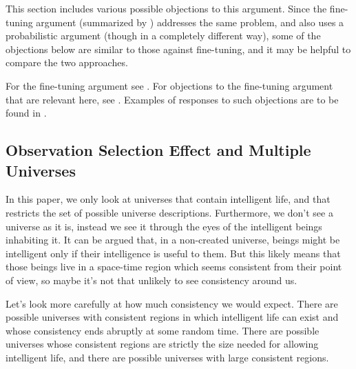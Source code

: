 \documentclass[a4paper
,draft
]{article}
\newcommand{\paper}[1]{paper}
\newcommand{\ghilimele}[1]{``#1"}
\begin{document}
This section includes various possible objections to this argument. Since the
fine-tuning argument (summarized by \parencite{sep-fine-tuning}) addresses the same problem, and also uses a
probabilistic argument (though in a completely different way), some of the
objections below are similar to those against fine-tuning, and it may be helpful
to compare the two approaches.

For the fine-tuning argument see \parencite{sep-fine-tuning}.
For objections to the fine-tuning argument that are relevant here, see
\parencites{Manson2003}{Manson2009}{McGrew2001}{Narveson2003}{Sober2009}.
Examples of responses to such objections are to be found in
\textcites{Leslie2003}{Swinburne2003}{Monton2006}{Kotzen2012}.



\subsection{Observation Selection Effect and Multiple Universes}

In this \paper{}, we only look at universes that contain intelligent life,
and that restricts the set of possible universe descriptions.
Furthermore, we don't see a universe as it is, instead we see it
through the eyes of the intelligent beings inhabiting it.
It can be argued that, in a non-created universe, beings might be intelligent
only if their intelligence is useful to them.
But this likely means that those beings live in a space-time region which seems
consistent from their point of view, so maybe it's not that unlikely to see
consistency around us.

Let's look more carefully at how much consistency we would expect.
There are possible universes with consistent regions in which
intelligent life can exist and whose consistency ends abruptly at some
random time. There are possible universes whose consistent regions are
strictly the size needed for allowing intelligent life, and there are possible
universes with large consistent regions.
\end{document}
